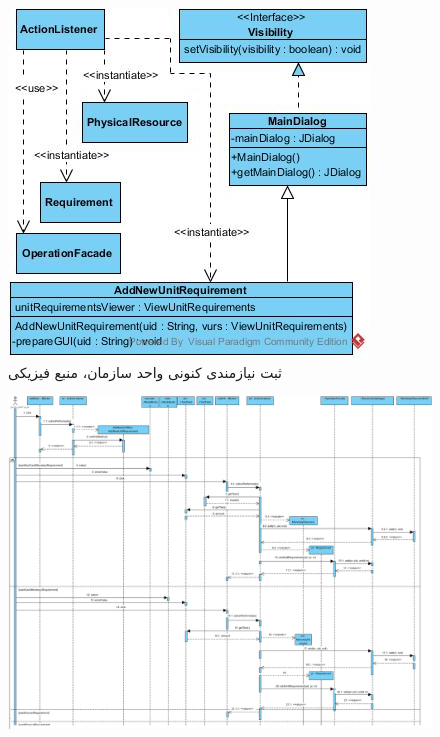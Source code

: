 \begin{landscape}
\begin{figure}[H]
	\includegraphics[scale=0.5]{img/sequence-design/AddRequirementToUnit_PHYSICALUI}
	\caption{ثبت نیازمندی کنونی واحد سازمان، منبع فیزیکی}
\end{figure}
\begin{figure}[H]
	\centering
	\includegraphics[scale=0.45]{img/sequence-design/AddRequirementToUnit_MONETARY}
\end{figure}
\begin{figure}[H]
	\centering

\end{figure}
\end{landscape}
